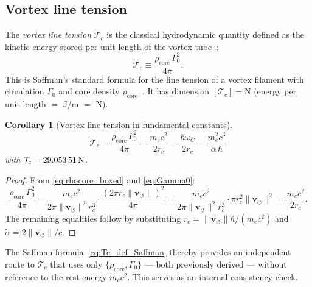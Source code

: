 \documentclass[aps,pra,preprint,longbibliography,nofootinbib]{revtex4-2}
\newtheorem{corollary}{Corollary}
\newcommand{\vnorm}{\lVert\mathbf{v}_{\!\boldsymbol{\circlearrowleft}}\rVert} %
\newcommand{\rhocore}{\rho_{\mathrm{core}}}      %
\newcommand{\rc}{r_c}                            %
\newcommand{\omC}{\omega_C}                      %
\newcommand{\Tc}{\mathcal{T}_c}                  %
\newcommand{\Gz}{\Gamma_0}                       %
\begin{document}
\subsection{Vortex line tension}
\label{sec:Tc}

The \emph{vortex line tension} $\Tc$ is the classical hydrodynamic
quantity defined as the kinetic energy stored per unit length of the
vortex tube~\cite{Saffman1992}:
\begin{equation}
  \Tc \equiv \frac{\rhocore\,\Gz^2}{4\pi}.
  \label{eq:Tc_def_Saffman}
\end{equation}
This is Saffman's standard formula for the line tension of a vortex
filament with circulation $\Gz$ and core density
$\rhocore$~\cite{Saffman1992}.
It has dimension $[\Tc] = \mathrm{N}$ (energy per unit length $=$ J/m $=$ N).

\begin{corollary}[Vortex line tension in fundamental constants]
\label{cor:Tc}
\begin{equation}
  \boxed{
    \Tc = \frac{\rhocore\,\Gz^2}{4\pi}
        = \frac{m_e c^2}{2\rc}
        = \frac{\hbar\omC}{2\rc}
        = \frac{m_e^2 c^3}{\tilde\alpha\,\hbar}
  }
  \label{eq:Tc}
\end{equation}
with $\Tc = \SI{29.053\,51}{\newton}$.
\end{corollary}

\begin{proof}
From \eqref{eq:rhocore_boxed} and \eqref{eq:Gamma0}:
\begin{equation}
  \frac{\rhocore\,\Gz^2}{4\pi}
  = \frac{m_e c^2}{2\pi\vnorm^2\rc^3}
    \cdot
    \frac{(2\pi\rc\vnorm)^2}{4\pi}
  = \frac{m_e c^2}{2\pi\vnorm^2\rc^3}
    \cdot \pi\rc^2\vnorm^2
  = \frac{m_e c^2}{2\rc}.
\end{equation}
The remaining equalities follow by substituting
$\rc = \vnorm\hbar/(m_e c^2)$ and $\tilde\alpha = 2\vnorm/c$.
\end{proof}

The Saffman formula~\eqref{eq:Tc_def_Saffman} thereby provides an
independent route to $\Tc$ that uses only
$\{\rhocore,\Gz\}$ — both previously derived — without reference to
the rest energy $m_e c^2$.
This serves as an internal consistency check.
\end{document}
